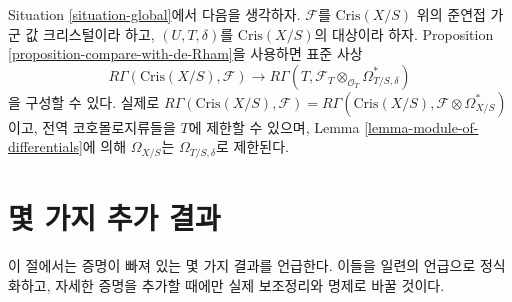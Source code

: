 \noindent
Situation \ref{situation-global}에서 다음을 생각하자.
$\mathcal{F}$를 $\text{Cris}(X/S)$ 위의 준연접 가군 값 크리스털이라
하고, $(U, T, \delta)$를 $\text{Cris}(X/S)$의 대상이라 하자.
Proposition \ref{proposition-compare-with-de-Rham}을 사용하면 표준 사상
\begin{equation}
\label{equation-restriction}
R\Gamma(\text{Cris}(X/S), \mathcal{F})
\longrightarrow
R\Gamma(T, \mathcal{F}_T \otimes_{\mathcal{O}_T} \Omega^*_{T/S, \delta})
\end{equation}
을 구성할 수 있다. 실제로
$R\Gamma(\text{Cris}(X/S), \mathcal{F}) =
R\Gamma(\text{Cris}(X/S), \mathcal{F} \otimes \Omega^*_{X/S})$이고,
전역 코호몰로지류들을 $T$에 제한할 수 있으며, Lemma
\ref{lemma-module-of-differentials}에 의해 $\Omega_{X/S}$는
$\Omega_{T/S, \delta}$로 제한된다.


















\section{몇 가지 추가 결과}
\label{section-missing}

\noindent
이 절에서는 증명이 빠져 있는 몇 가지 결과를 언급한다. 이들을
일련의 언급으로 정식화하고, 자세한 증명을 추가할 때에만 실제
보조정리와 명제로 바꿀 것이다.


